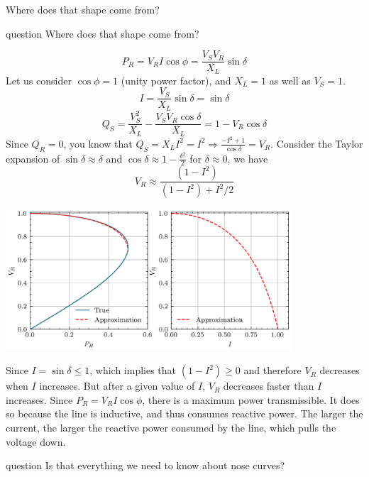 \begin{frame}[allowframebreaks]{Where does that shape come from?}
\begin{block}{question}
Where does that shape come from?
\end{block}

$$P_R = V_R I \cos{\phi} = \frac{V_SV_R}{X_L}\sin \delta$$
Let us consider $\cos{\phi} = 1$ (unity power factor), and $X_L=1$ as well as $V_S=1$.
$$I = \frac{V_S}{X_L}\sin \delta = \sin \delta$$
$$Q_S = \frac{V_S^2}{X_L} - \frac{V_S V_R \cos \delta}{X_L} = 1-V_R \cos \delta$$
Since $Q_R = 0$, you know that $Q_S = X_L I^2 = I^2 \Rightarrow \frac{-I^2+1}{\cos \delta} = V_R$.
Consider the Taylor expansion of $\sin \delta \approx \delta$ and $\cos \delta \approx 1-\frac{\delta^2}{2}$ for $\delta \approx 0$, we have
$$V_R \approx \frac{(1-I^2)}{(1-I^2)+I^2/2}$$


\begin{center}
\includegraphics[width=0.8\textwidth]{images/NoseCurveApprox.png}
\end{center}
Since $I=\sin \delta \leq 1$, which implies that $(1-I^2) \geq 0$ and therefore $V_R$ decreases when $I$ increases. But after a given value of $I$, $V_R$ decreases faster than $I$ increases. Since $P_R = V_R I \cos{\phi}$, there is a maximum power transmissible.
It does so because the line is inductive, and thus consumes reactive power. The larger the current, the larger the reactive power consumed by the line, which pulls the voltage down.
\begin{block}{question}
Is that everything we need to know about nose curves?
\end{block}




\end{frame}
